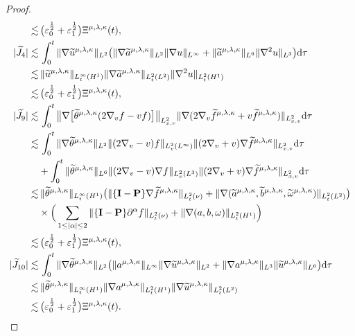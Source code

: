 \documentclass[reqno,11pt]{amsart}
\theoremstyle{plain}
\numberwithin{equation}{section}
\newcommand{\eps}{{\varepsilon}}
\begin{document}
\begin{proof}
\begin{align}
\lesssim&\, \big(\eps_0^\frac{1}{2}+\eps_1^\frac{1}{2}\big){\Xi} ^{\mu,\lambda,\kappa}(t),\label{G4.18-2}\\
|\widetilde{J}_4|\lesssim&\,\int_0^t \|\nabla\widetilde{u}^{\mu,\lambda,\kappa}\|_{L^2}\big(\|\nabla \widetilde{a}^{\mu,\lambda,\kappa}\|_{L^2}\|\nabla u\|_{L^\infty}+\|\widetilde{a}^{\mu,\lambda,\kappa}\|_{L^6}\|\nabla^2 u\|_{L^3}\big){\rm d}\tau\nonumber\\
\lesssim&\, \|\widetilde{u}^{\mu,\lambda,\kappa}\|_{L_t^\infty(H^1)}\|\nabla\widetilde{a}^{\mu,\lambda,\kappa}\|_{L_t^2(L^2)}\|\nabla^2 u\|_{L_t^2(H^1)}\nonumber\\
\lesssim&\, \big(\eps_0^\frac{1}{2}+\eps_1^\frac{1}{2}\big){\Xi} ^{\mu,\lambda,\kappa}(t),\label{G4.18-3}\\
|\widetilde{J}_9|\lesssim&\,\int_0^t \big\|\nabla\big[\widetilde{\theta}^{\mu,\lambda,\kappa}(2\nabla_v f-vf) \big]\big\|_{L_{x,v}^2} \|\nabla  (2\nabla_v \widetilde{f}^{\mu,\lambda,\kappa}+v\widetilde{f}^{\mu,\lambda,\kappa})   \|_{L_{x,v}^2} {\rm d}\tau\nonumber\\
\lesssim&\, \int_0^t \|\nabla\widetilde\theta^{\mu,\lambda,\kappa}\|_{L^2}\|(2\nabla_v-v)  f\|_{L_v^2(L^\infty)} \|(2\nabla_v+v)\nabla \widetilde{f}^{\mu,\lambda,\kappa}\|_{L_{x,v}^2 }{\rm d}\tau \nonumber\\
&+\int_0^t  \| \widetilde\theta^{\mu,\lambda,\kappa}\|_{L^6}\|(2\nabla_v-v)  \nabla f\|_{L_v^2(L^3)} \|(2\nabla_v+v)\nabla \widetilde{f}^{\mu,\lambda,\kappa}\|_{L_{x,v}^2 }{\rm d}\tau \nonumber\\
\lesssim&\, \|\widetilde{\theta}^{\mu,\lambda,\kappa}\|_{L_t^\infty(H^1)}\big(\|\{\mathbf{I}-\mathbf{P}\}\nabla\widetilde{f}^{\mu,\lambda,\kappa}\|_{L_t^2(\nu)} +\|\nabla(\widetilde{a}^{\mu,\lambda,\kappa},\widetilde{b}^{\mu,\lambda,\kappa},\widetilde{\omega}^{\mu,\lambda,\kappa})\|_{L_t^2(L^2)} \big)\nonumber\\
&\times \Big(\sum_{1\leq |\alpha|\leq 2}\|\{\mathbf{I}-\mathbf{P}\}\partial^\alpha {f} \|_{L_t^2(\nu)}+\|\nabla(a,b,\omega)\|_{L_t^2(H^1)}\Big)\nonumber\\
\lesssim&\, \big(\eps_0^\frac{1}{2}+\eps_1^\frac{1}{2}\big){\Xi} ^{\mu,\lambda,\kappa}(t),\label{G4.18-4}\\
|\widetilde{J}_{10}|\lesssim&\,\int_0^t \|\nabla\widetilde{\theta}^{\mu,\lambda,\kappa}\|_{L^2}\big(\| {a}^{\mu,\lambda,\kappa}\|_{L^\infty}\|\nabla\widetilde{u}^{\mu,\lambda,\kappa}\|_{L^2}+\|\nabla a^{\mu,\lambda,\kappa}\|_{L^3}\|\widetilde{u}^{\mu,\lambda,\kappa}\|_{L^6}\big){\rm d}\tau\nonumber\\
\lesssim&\, \|\widetilde{\theta}^{\mu,\lambda,\kappa}\|_{L_t^\infty(H^1)}\|\nabla a^{\mu,\lambda,\kappa}\|_{L_t^2(H^1)}\|\nabla\widetilde{u}^{\mu,\lambda,\kappa}\|_{L_t^2(L^2)}\nonumber\\
\lesssim&\, \big(\eps_0^\frac{1}{2}+\eps_1^\frac{1}{2}\big){\Xi} ^{\mu,\lambda,\kappa}(t).\label{G4.18-5}
\end{align}


\end{proof}
\end{document}
